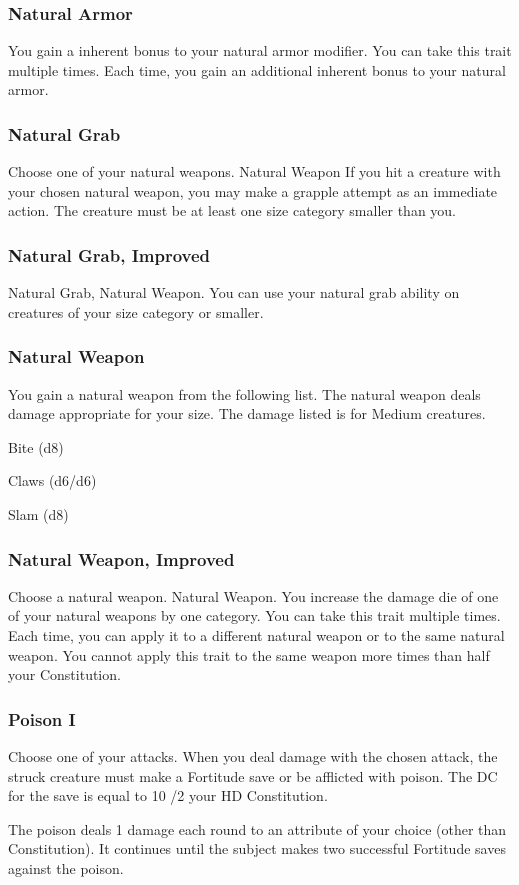 \subsubsection{Natural Armor}
\featben You gain a  inherent bonus to your natural armor modifier.
 You can take this trait multiple times. Each time, you gain an additional  inherent bonus to your natural armor.

\subsubsection{Natural Grab}
Choose one of your natural weapons.
\featpre Natural Weapon
\featben If you hit a creature with your chosen natural weapon, you may make a grapple attempt as an immediate action. The creature must be at least one size category smaller than you.

\subsubsection{Natural Grab, Improved}
\featpre Natural Grab, Natural Weapon.
\featben You can use your natural grab ability on creatures of your size category or smaller.

\subsubsection{Natural Weapon}
\featben You gain a natural weapon from the following list. The natural weapon deals damage appropriate for your size. The damage listed is for Medium creatures.
\begin{itemize*}
    \item Bite (d8)
    \item Claws (d6/d6)
    \item Slam (d8)
\end{itemize*}

\subsubsection{Natural Weapon, Improved}
Choose a natural weapon.
\featpre Natural Weapon.
\featben You increase the damage die of one of your natural weapons by one category.
 You can take this trait multiple times. Each time, you can apply it to a different natural weapon or to the same natural weapon. You cannot apply this trait to the same weapon more times than half your Constitution. 

\subsubsection{Poison I}
Choose one of your attacks.
\featben When you deal damage with the chosen attack, the struck creature must make a Fortitude save or be afflicted with poison. The DC for the save is equal to 10 /2 your HD \add Constitution.
\par The poison deals 1 damage each round to an attribute of your choice (other than Constitution). It continues until the subject makes two successful Fortitude saves against the poison.

